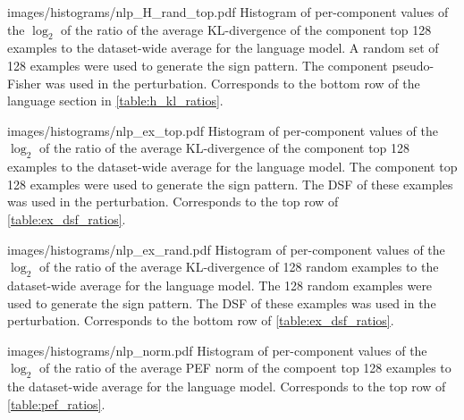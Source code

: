 \documentclass[dvipsnames]{article}
\begin{document}
\appendixhistogram
{images/histograms/nlp_H_rand_top.pdf}
{Histogram of per-component values of the $\log_2$ of the ratio of the average KL-divergence of the component top 128 examples to the dataset-wide average for the language model.
A random set of 128 examples were used to generate the sign pattern.
The component pseudo-Fisher was used in the perturbation.
Corresponds to the bottom row of the language section in \cref{table:h_kl_ratios}.}



\appendixhistogram
{images/histograms/nlp_ex_top.pdf}
{Histogram of per-component values of the $\log_2$ of the ratio of the average KL-divergence of the component top 128 examples to the dataset-wide average for the language model.
The component top 128 examples were used to generate the sign pattern.
The DSF of these examples was used in the perturbation.
Corresponds to the top row of \cref{table:ex_dsf_ratios}.}

\appendixhistogram
{images/histograms/nlp_ex_rand.pdf}
{Histogram of per-component values of the $\log_2$ of the ratio of the average KL-divergence of 128 random examples to the dataset-wide average for the language model.
The 128 random examples were used to generate the sign pattern.
The DSF of these examples was used in the perturbation.
Corresponds to the bottom row of \cref{table:ex_dsf_ratios}.}



\appendixhistogram
{images/histograms/nlp_norm.pdf}
{Histogram of per-component values of the $\log_2$ of the ratio of the average PEF norm of the compoent top 128 examples to the dataset-wide average for the language model.
Corresponds to the top row of \cref{table:pef_ratios}.}





\end{document}
